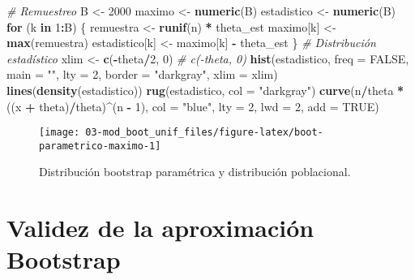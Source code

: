 \documentclass[]{book}
\newenvironment{Shaded}{\begin{snugshade}}{\end{snugshade}}
\newcommand{\KeywordTok}[1]{\textcolor[rgb]{0.13,0.29,0.53}{\textbf{#1}}}
\newcommand{\DataTypeTok}[1]{\textcolor[rgb]{0.13,0.29,0.53}{#1}}
\newcommand{\DecValTok}[1]{\textcolor[rgb]{0.00,0.00,0.81}{#1}}
\newcommand{\StringTok}[1]{\textcolor[rgb]{0.31,0.60,0.02}{#1}}
\newcommand{\CommentTok}[1]{\textcolor[rgb]{0.56,0.35,0.01}{\textit{#1}}}
\newcommand{\OtherTok}[1]{\textcolor[rgb]{0.56,0.35,0.01}{#1}}
\newcommand{\ControlFlowTok}[1]{\textcolor[rgb]{0.13,0.29,0.53}{\textbf{#1}}}
\newcommand{\OperatorTok}[1]{\textcolor[rgb]{0.81,0.36,0.00}{\textbf{#1}}}
\newcommand{\NormalTok}[1]{#1}
\theoremstyle{break}
\theoremstyle{definition}
\theoremstyle{definition}
\theoremstyle{definition}
\theoremstyle{remark}
\begin{document}
\begin{Shaded}
\begin{Highlighting}[]
\CommentTok{# Remuestreo}
\NormalTok{B <-}\StringTok{ }\DecValTok{2000}
\NormalTok{maximo <-}\StringTok{ }\KeywordTok{numeric}\NormalTok{(B)}
\NormalTok{estadistico <-}\StringTok{ }\KeywordTok{numeric}\NormalTok{(B)}
\ControlFlowTok{for}\NormalTok{ (k }\ControlFlowTok{in} \DecValTok{1}\OperatorTok{:}\NormalTok{B) \{}
\NormalTok{    remuestra <-}\StringTok{ }\KeywordTok{runif}\NormalTok{(n) }\OperatorTok{*}\StringTok{ }\NormalTok{theta_est}
\NormalTok{    maximo[k] <-}\StringTok{ }\KeywordTok{max}\NormalTok{(remuestra)}
\NormalTok{    estadistico[k] <-}\StringTok{ }\NormalTok{maximo[k] }\OperatorTok{-}\StringTok{ }\NormalTok{theta_est}
\NormalTok{\}}
\CommentTok{# Distribución estadístico}
\NormalTok{xlim <-}\StringTok{ }\KeywordTok{c}\NormalTok{(}\OperatorTok{-}\NormalTok{theta}\OperatorTok{/}\DecValTok{2}\NormalTok{, }\DecValTok{0}\NormalTok{) }\CommentTok{# c(-theta, 0)}
\KeywordTok{hist}\NormalTok{(estadistico, }\DataTypeTok{freq =} \OtherTok{FALSE}\NormalTok{, }\DataTypeTok{main =} \StringTok{""}\NormalTok{, }\DataTypeTok{lty =} \DecValTok{2}\NormalTok{, }
     \DataTypeTok{border =} \StringTok{"darkgray"}\NormalTok{, }\DataTypeTok{xlim =}\NormalTok{ xlim)}
\KeywordTok{lines}\NormalTok{(}\KeywordTok{density}\NormalTok{(estadistico))}
\KeywordTok{rug}\NormalTok{(estadistico, }\DataTypeTok{col =} \StringTok{"darkgray"}\NormalTok{)}
\KeywordTok{curve}\NormalTok{(n}\OperatorTok{/}\NormalTok{theta }\OperatorTok{*}\StringTok{ }\NormalTok{((x }\OperatorTok{+}\StringTok{ }\NormalTok{theta)}\OperatorTok{/}\NormalTok{theta)}\OperatorTok{^}\NormalTok{(n }\OperatorTok{-}\StringTok{ }\DecValTok{1}\NormalTok{), }\DataTypeTok{col =} \StringTok{"blue"}\NormalTok{, }\DataTypeTok{lty =} \DecValTok{2}\NormalTok{, }\DataTypeTok{lwd =} \DecValTok{2}\NormalTok{, }\DataTypeTok{add =} \OtherTok{TRUE}\NormalTok{)}
\end{Highlighting}
\end{Shaded}

\begin{figure}[!htb]

{\centering \texttt{[image: 03-mod\_boot\_unif\_files/figure-latex/boot-parametrico-maximo-1]} 

}

\caption{Distribución bootstrap paramétrica y distribución poblacional.}\label{fig:boot-parametrico-maximo}
\end{figure}

\section{Validez de la aproximación
Bootstrap}\label{validez-de-la-aproximaciuxf3n-bootstrap}
\end{document}
